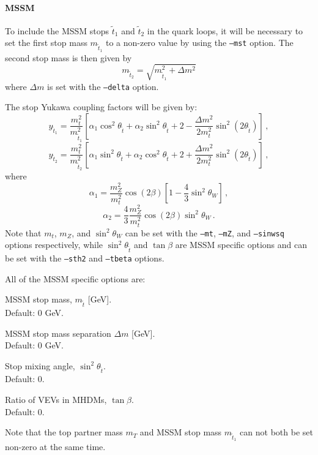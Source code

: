 \documentclass[12pt,a4wide]{article}
\begin{document}
\paragraph{MSSM}
To include the MSSM stops $\tilde{t}_1$ and $\tilde{t}_2$ in the quark loops, it will be necessary to set the first stop mass $m_{\tilde{t}_1}$ to a non-zero value by using the \texttt{--mst} option. The second stop mass is then given by 
\begin{equation}
	m_{\tilde{t}_2} = \sqrt{m_{\tilde{t}_1}^2 + \Delta m^2} 
\end{equation}
where $\Delta m$ is set with the \texttt{--delta} option. 

The stop Yukawa coupling factors will be given by: 
\begin{equation}
   y_{\tilde{t}_1} = \frac{m_t^2}{m_{\tilde{t}_1}^2} \left [ \alpha_1 \cos^2 \theta_{\tilde{t}} + \alpha_2 \sin^2 \theta_{\tilde{t}} + 2 - \frac{\Delta m^2}{2 m_t^2} \sin^2\left ( 2 \theta_{\tilde{t}} \right ) \right ] \,,
\end{equation} 
\begin{equation}
   y_{\tilde{t}_2} = \frac{m_t^2}{m_{\tilde{t}_2}^2} \left [ \alpha_1 \sin^2 \theta_{\tilde{t}} + \alpha_2 \cos^2 \theta_{\tilde{t}} + 2 + \frac{\Delta m^2}{2 m_t^2} \sin^2\left ( 2 \theta_{\tilde{t}} \right ) \right ] \,, 
\end{equation} 
where 
\begin{equation}
   \alpha_1 = \frac{m_Z^2}{m_t^2} \cos \left ( 2 \beta \right ) \left [ 1 - \frac{4}{3} \sin^2\theta_W \right ] \,, 
\end{equation} 
\begin{equation}
   \alpha_2 = \frac{4}{3} \frac{m_Z^2}{m_t^2} \cos \left ( 2 \beta \right ) \sin^2\theta_W \,. 
\end{equation} 
Note that $m_t$, $m_Z$, and $\sin^2\theta_W$ can be set with the \texttt{--mt}, \texttt{--mZ}, and \texttt{--sinwsq} options respectively, while $\sin^2 \theta_{\tilde{t}}$ and $\tan\beta$ are MSSM specific options and can be set with the \texttt{--sth2} and \texttt{--tbeta} options. 

All of the MSSM specific options are: 
\begin{description}[labelindent=\parindent, labelwidth =\widthof{\bfseries9999999999999999999999}, leftmargin = !] 
	\item[\texttt{--mst <value>}] MSSM stop mass, $m_{\tilde{t}}$ [GeV]. \\ Default: 0 GeV. 
	\item[\texttt{--delta <value>}] MSSM stop mass separation $\Delta m$ [GeV]. \\ Default: 0 GeV. 
	\item[\texttt{--sth2 <value>}] Stop mixing angle, $\sin^2 \theta_{\tilde{t}}$. \\ Default: 0. 
	\item[\texttt{--tbeta <value>}] Ratio of VEVs in MHDMs, $\tan\beta$. \\ Default: 0. 
\end{description}
Note that the top partner mass $m_{T}$ and MSSM stop mass $m_{\tilde{t}_1}$ can not both be set non-zero at the same time. 
\end{document}
